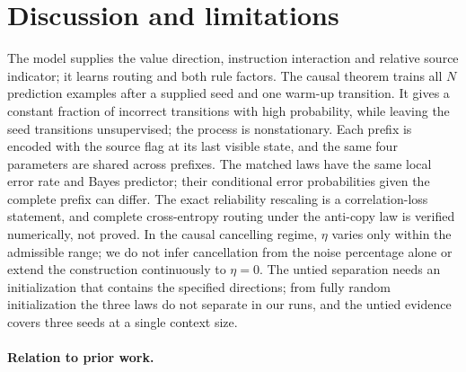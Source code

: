 \begin{table}[t]
\centering\small
\caption{\textbf{Untied one-block training under the anti-copy law.} Every matrix entry trains; binary cross-entropy, $N=16$, $\eta=0.1$.
Each cell: seeds (of three) reaching $99\%$ clean-rule accuracy within gradient-flow time $3\times10^4$, and their median time.
$\kappa=1$: independent decoys; $\kappa=0$: one anti-copy; $\kappa=-1$: two anti-copies.}
\label{tab:untied}
\fitwidth{}
\end{table}

\section{Discussion and limitations}
\label{sec:scope}
The model supplies the value direction, instruction interaction and relative source indicator; it learns routing and both rule factors.
The causal theorem trains all $N$ prediction examples after a supplied seed and one warm-up transition.
It gives a constant fraction of incorrect transitions with high probability, while leaving the seed transitions unsupervised; the process is nonstationary.
Each prefix is encoded with the source flag at its last visible state, and the same four parameters are shared across prefixes.
The matched laws have the same local error rate and Bayes predictor; their conditional error probabilities given the complete prefix can differ.
The exact reliability rescaling is a correlation-loss statement, and complete cross-entropy routing under the anti-copy law is verified numerically, not proved.
In the causal cancelling regime, $\eta$ varies only within the admissible range;
we do not infer cancellation from the noise percentage alone or extend the construction continuously to $\eta=0$.
The untied separation needs an initialization that contains the specified directions; from fully random initialization the three laws do not separate in our runs,
and the untied evidence covers three seeds at a single context size.

\paragraph{Relation to prior work.}
\label{sec:related}

